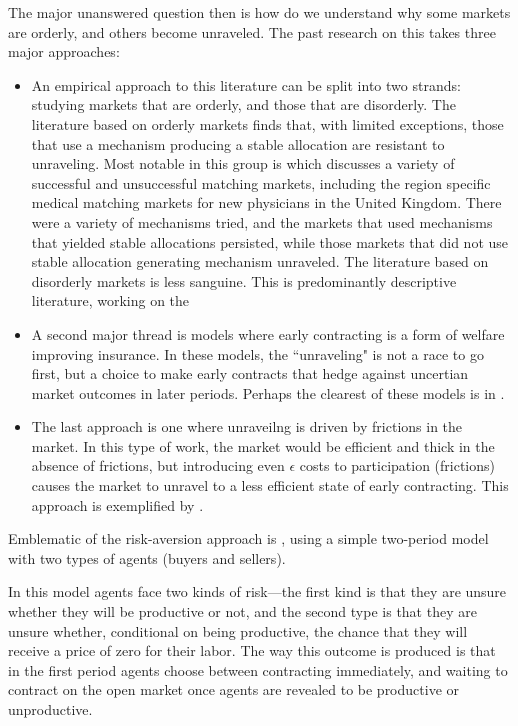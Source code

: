 \documentclass[AER]{AEA}
\begin{document}
The major unanswered question then is how do we understand why some markets are orderly, and others become unraveled.  The past research on this takes three major approaches:

\begin{itemize}
	\item An empirical approach to this literature can be split into two strands: studying markets that are orderly, and those that are disorderly. 
	\subitem The literature based on orderly markets finds that, with limited exceptions, those that use a mechanism producing a stable allocation are resistant to unraveling.  Most notable in this group is  \cite{Roth2002} which discusses a variety of successful and unsuccessful matching markets, including the region specific medical matching markets for new physicians in the United Kingdom.  There were a variety of mechanisms tried, and the markets that used mechanisms that yielded stable allocations persisted, while those markets that did not use stable allocation generating mechanism unraveled.
	\subitem The literature based on disorderly markets is less sanguine. This is predominantly descriptive literature, working on the 
	\item  A second major thread is models where early contracting is a form of welfare improving insurance. In these models, the ``unraveling" is not a race to go first, but a choice to make early contracts that hedge against uncertian market outcomes in later periods.  Perhaps the clearest of these models is in \cite{Li1998}.
	\item The last approach is one where unraveilng is driven by frictions in the market. In this type of work, the market would be efficient and thick in the absence of frictions, but introducing even $\epsilon$ costs to participation (frictions) causes the market to unravel to a less efficient state of early contracting.  This approach is exemplified by \cite{Damiano2005}.
\end{itemize}




Emblematic of the risk-aversion approach is \cite{Li1998}, using a simple two-period model with two types of agents (buyers and sellers).  

In this model agents face two kinds of risk—the first kind is that they are unsure whether they will be productive or not, and the second type is that they are unsure whether, conditional on being productive, the chance that they will receive a price of zero for their labor.  The way this outcome is produced is that in the first period agents choose between contracting immediately, and waiting to contract on the open market once agents are revealed to be productive or unproductive.  
\end{document}
